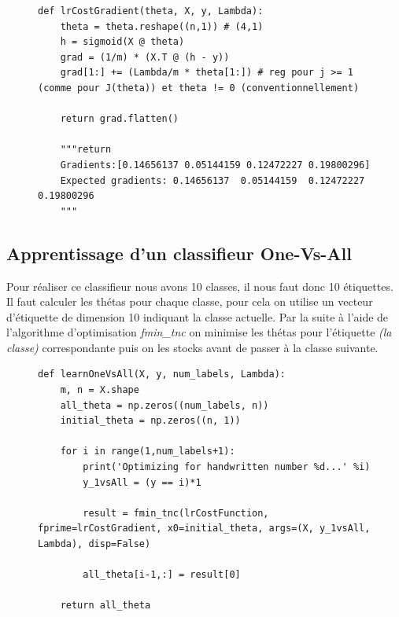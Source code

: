\begin{figure}[!h]
\begin{verbatim}
def lrCostGradient(theta, X, y, Lambda):
    theta = theta.reshape((n,1)) # (4,1)
    h = sigmoid(X @ theta)
    grad = (1/m) * (X.T @ (h - y))
    grad[1:] += (Lambda/m * theta[1:]) # reg pour j >= 1 (comme pour J(theta)) et theta != 0 (conventionnellement)

    return grad.flatten()

    """return 
    Gradients:[0.14656137 0.05144159 0.12472227 0.19800296]
    Expected gradients: 0.14656137  0.05144159  0.12472227  0.19800296
    """
\end{verbatim}   
\end{figure}

\clearpage
\subsection{Apprentissage d'un classifieur One-Vs-All}

Pour réaliser ce classifieur nous avons 10 classes, il nous faut donc 10 étiquettes. Il faut calculer les thétas pour chaque classe, pour cela on utilise un vecteur d'étiquette de dimension 10 indiquant 
la classe actuelle. Par la suite à l'aide de l'algorithme d'optimisation \textit{fmin\_tnc} on minimise les thétas pour l'étiquette \textit{(la classe)} correspondante puis on les stocks avant de passer à la 
classe suivante.

\begin{figure}[!h]
\begin{verbatim}
def learnOneVsAll(X, y, num_labels, Lambda):
    m, n = X.shape
    all_theta = np.zeros((num_labels, n))
    initial_theta = np.zeros((n, 1))

    for i in range(1,num_labels+1):
        print('Optimizing for handwritten number %d...' %i)
        y_1vsAll = (y == i)*1

        result = fmin_tnc(lrCostFunction, fprime=lrCostGradient, x0=initial_theta, args=(X, y_1vsAll, Lambda), disp=False)
        
        all_theta[i-1,:] = result[0]

    return all_theta
\end{verbatim}   
\end{figure}
        

